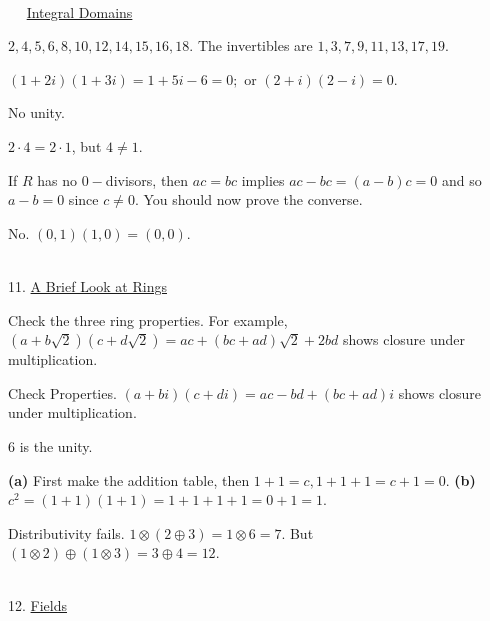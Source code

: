 \documentclass[12pt]{book}
\theoremstyle{definition}
\begin{document}
~\\[.1in]
{\large~~  \underline{Integral Domains}}

\begin{oddenumerate}
	\item  $ 2,4,5,6,8,10,12,14,15,16,18 $. The invertibles are $ 1,3,7,9,11,13,17,19. $
	
	\item $ (1+2i)(1+3i)= 1+5i-6=0; $ or $ (2+i)(2-i)=0. $
	
	\item No unity.
	
	\item $ 2\cdot 4= 2\cdot 1 $, but $ 4\neq 1. $
	
	\item If $ R $ has no $ 0- $divisors, then $ ac=bc $ implies $ ac-bc=(a-b)c=0 $ and so $ a-b=0 $ since $ c\neq 0. $ You should now prove the converse. 
	
	\item No. $ (0,1)(1,0)=(0,0) $.
	
\end{oddenumerate}


~\\[.1in]
{\Large 11. \underline{A Brief Look at Rings}}

\begin{oddenumerate}
	\item Check the three ring properties. For example, $ (a+b\sqrt{2})(c+d\sqrt{2})=ac+(bc+ad)\sqrt{2}+2bd $ shows closure under multiplication.
	
	\item Check Properties. $ (a+bi)(c+di)=ac-bd+(bc+ad)i $ shows closure under multiplication.
	
	\item 6 is the unity.
	
	\item \textbf{(a)} First make the addition table, then $ 1+1=c, 1+1+1=c+1=0 $. \textbf{(b) }$ c^2=(1+1)(1+1)=1+1+1+1=0+1=1. $
	
	\item Distributivity fails. $ 1 \otimes (2\oplus3)=1\otimes6=7 $. But $ (1\otimes 2)\oplus(1\otimes 3)=3\oplus4=12. $
	
	
	
	
\end{oddenumerate}

~\\[.1in]
{\Large 12. \underline{Fields}}
\end{document}
